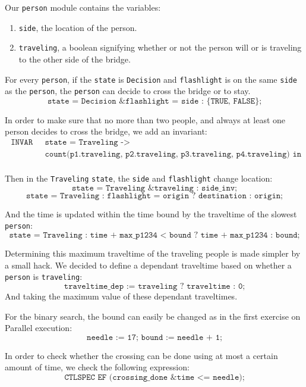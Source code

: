 \documentclass[12pt]{article}
\begin{document}
Our \texttt{person} module contains the variables:
\begin{enumerate}
\item \texttt{side}, the location of the person.
\item \texttt{traveling}, a boolean signifying whether or not the person will or is traveling to the other side of the bridge.
\end{enumerate}

For every \texttt{person}, if the \texttt{state} is \texttt{Decision} and \texttt{flashlight} is on the same \texttt{side} as the \texttt{person}, the \texttt{person} can decide to cross the bridge or to stay.
\[ \texttt{state = Decision \& flashlight = side : \{TRUE, FALSE\};} \]

In order to make sure that no more than two people, and always at least one person decides to cross the bridge, we add an invariant:
\[
    \begin{array}{ll}
        \texttt{ INVAR } & \texttt{ state = Traveling -> } \\
        & \texttt{ count(p1.traveling, p2.traveling, p3.traveling, p4.traveling) in 1..2; } \\
    \end{array}
\]

Then in the \texttt{Traveling} \texttt{state}, the \texttt{side} and \texttt{flashlight} change location:
\[ \texttt{state = Traveling \& traveling : side\_inv;} \]
\[ \texttt{state = Traveling : flashlight = origin ? destination : origin;} \]

And the time is updated within the time bound by the traveltime of the slowest \texttt{person}:
\[ \texttt{state = Traveling : time + max\_p1234 < bound ? time + max\_p1234 : bound;} \]

Determining this maximum traveltime of the traveling people is made simpler by a small hack.
We decided to define a dependant traveltime based on whether a \texttt{person} is \texttt{traveling}:
\[ \texttt{traveltime\_dep := traveling ? traveltime : 0;} \]
And taking the maximum value of these dependant traveltimes.

For the binary search, the bound can easily be changed as in the first exercise on Parallel execution:
\[\texttt{needle := 17; bound := needle + 1;}\]

In order to check whether the crossing can be done using at most a certain amount of time, we check the following expression:
\[ \texttt{CTLSPEC EF (crossing\_done \& time <= needle);} \]
\end{document}
